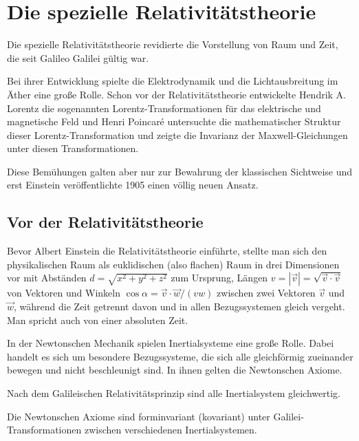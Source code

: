 

\chapter{Die spezielle Relativitätstheorie}

Die spezielle Relativitätstheorie revidierte die Vorstellung von Raum und Zeit, die seit Galileo Galilei gültig war.

Bei ihrer Entwicklung spielte die Elektrodynamik und die Lichtausbreitung im Äther eine große Rolle.
Schon vor der Relativitätstheorie entwickelte Hendrik A. Lorentz die sogenannten Lorentz-Transformationen für das elektrische und magnetische Feld und Henri Poincaré untersuchte die mathematischer Struktur dieser Lorentz-Transformation und zeigte die Invarianz der Maxwell-Gleichungen unter diesen Transformationen.

Diese Bemühungen galten aber nur zur Bewahrung der klassischen Sichtweise und erst Einstein veröffentlichte 1905 einen völlig neuen Ansatz.

\section{Vor der Relativitätstheorie}

Bevor Albert Einstein die Relativitätstheorie einführte, stellte man sich den physikalischen Raum als euklidischen (also flachen) Raum in drei Dimensionen vor mit Abständen $d=\sqrt{x^2+y^2+z^2}$ zum Ursprung, Längen $v=\left|\vec v\right|=\sqrt{\vec v\cdot \vec v}$ von Vektoren und Winkeln $\cos\alpha=\vec v\cdot \vec w/(vw)$ zwischen zwei Vektoren $\vec v$ und $\vec w$, während die Zeit getrennt davon und in allen Bezugssystemen gleich vergeht.
Man spricht auch von einer absoluten Zeit.

In der Newtonschen Mechanik spielen Inertialsysteme eine große Rolle.
Dabei handelt es sich um besondere Bezugssysteme, die sich alle gleichförmig zueinander bewegen und nicht beschleunigt sind.
In ihnen gelten die Newtonschen Axiome.

Nach dem Galileischen Relativitätsprinzip sind alle Inertialsystem gleichwertig.

\begin{formal}
    Die Newtonschen Axiome sind forminvariant (kovariant) unter Galilei-Transformationen zwischen verschiedenen Inertialsystemen.
\end{formal}



